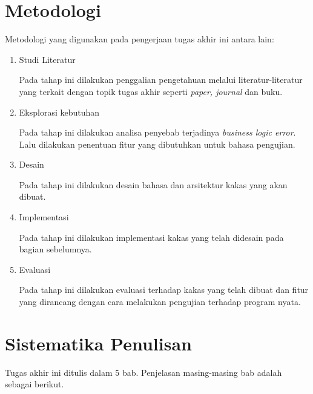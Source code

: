 \section{Metodologi}

Metodologi yang digunakan pada pengerjaan tugas akhir ini antara lain:

\begin{enumerate}
      \item Studi Literatur

            Pada tahap ini dilakukan penggalian pengetahuan melalui literatur-literatur yang terkait
            dengan topik tugas akhir seperti \textit{paper, journal} dan buku.

      \item Eksplorasi kebutuhan

            Pada tahap ini dilakukan analisa penyebab terjadinya \emph{business logic error}.
            Lalu dilakukan penentuan fitur yang dibutuhkan untuk bahasa pengujian.

      \item Desain

            Pada tahap ini dilakukan desain bahasa dan arsitektur kakas yang akan dibuat.

      \item Implementasi

            Pada tahap ini dilakukan implementasi kakas yang telah didesain pada bagian sebelumnya.

      \item Evaluasi

            Pada tahap ini dilakukan evaluasi terhadap kakas yang telah dibuat dan fitur yang dirancang
            dengan cara melakukan pengujian terhadap program nyata.
\end{enumerate}


\section{Sistematika Penulisan}

Tugas akhir ini ditulis dalam 5 bab. Penjelasan masing-masing bab adalah sebagai berikut.

